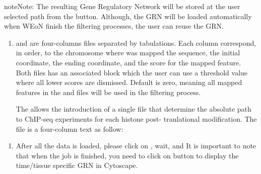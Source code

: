 \documentclass[letterpaper,10pt,english]{sphinxmanual}
\begin{document}
\begin{sphinxadmonition}{note}{Note:}
The resulting Gene Regulatory Network will be stored at the user selected path
from the  button. Although, the GRN will be loaded automatically
when WEoN finish the filtering processes, the user can reuse the GRN.
\end{sphinxadmonition}
\begin{enumerate}
\def\theenumi{\arabic{enumi}}
\def\labelenumi{\theenumi .}
\makeatletter\def\p@enumii{\p@enumi \theenumi .}\makeatother
\setcounter{enumi}{2}
\item {} 

 and  are four-columns files separated by
tabulations. Each column correspond, in order, to the chromosome where was mapped
the sequence, the initial coordinate, the ending coordinate, and the score for
the mapped feature. Both files has an associated  block which the user
can use a threshold value where all lower scores are dismissed. Default is zero,
meaning all mapped features in the  and  files will
be used in the filtering process.

The  allows the introduction of a single file that
determine the absolute path to ChIP-seq experiments for each histone post-
tranlational modification. The file is a four-column text as follow:

\end{enumerate}

\begin{enumerate}
\def\theenumi{\arabic{enumi}}
\def\labelenumi{\theenumi .}
\makeatletter\def\p@enumii{\p@enumi \theenumi .}\makeatother
\setcounter{enumi}{3}
\item {} 

After all the data is loaded, please click on , wait, and
It is important to note that when the job is finished, you need to click on  button to display the time/tissue specific GRN in Cytoscape.

\end{enumerate}
\end{document}
